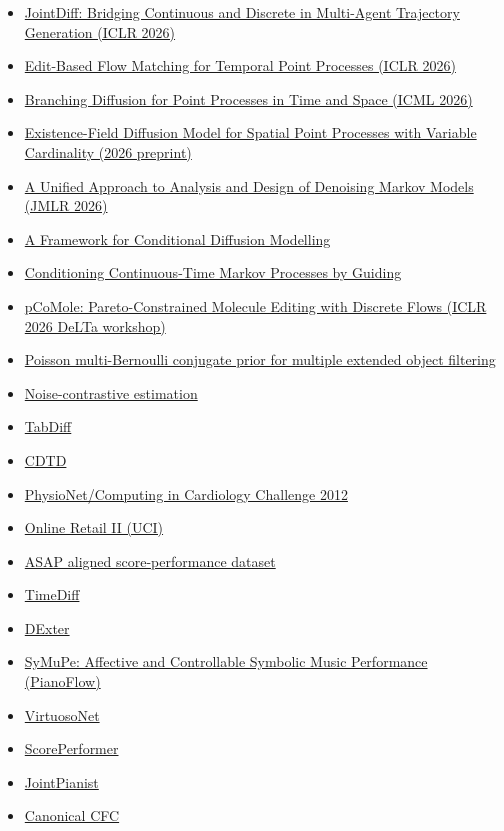 \documentclass[11pt]{article}
\begin{document}
\begin{itemize}
\item \href{https://openreview.net/forum?id=6jThckejtL}{JointDiff: Bridging Continuous and Discrete in Multi-Agent Trajectory Generation (ICLR 2026)}
\item \href{https://openreview.net/forum?id=FNf9IV1P2L}{Edit-Based Flow Matching for Temporal Point Processes (ICLR 2026)}
\item \href{https://openreview.net/pdf/574a07a3ab057971ab142c75a5fd8ad25a7c8312.pdf}{Branching Diffusion for Point Processes in Time and Space (ICML 2026)}
\item \href{https://arxiv.org/abs/2607.26428}{Existence-Field Diffusion Model for Spatial Point Processes with Variable Cardinality (2026 preprint)}
\item \href{https://www.jmlr.org/papers/v27/25-0693.html}{A Unified Approach to Analysis and Design of Denoising Markov Models (JMLR 2026)}
\item \href{https://openreview.net/forum?id=k2PA7CUUJH}{A Framework for Conditional Diffusion Modelling}
\item \href{https://doi.org/10.1080/17442508.2022.2150081}{Conditioning Continuous-Time Markov Processes by Guiding}
\item \href{https://openreview.net/forum?id=tTILzscPs4}{pCoMole: Pareto-Constrained Molecule Editing with Discrete Flows (ICLR 2026 DeLTa workshop)}
\item \href{https://doi.org/10.1109/TAES.2019.2920220}{Poisson multi-Bernoulli conjugate prior for multiple extended object filtering}
\item \href{https://proceedings.mlr.press/v9/gutmann10a.html}{Noise-contrastive estimation}
\item \href{https://openreview.net/forum?id=152c06fde5afb804fa5e2d50486a172bd56ec4e6}{TabDiff}
\item \href{https://openreview.net/forum?id=QPtoBPn4lZ}{CDTD}
\item \href{https://physionet.org/content/challenge-2012/1.0.0/}{PhysioNet/\allowbreak{}Computing in Cardiology Challenge 2012}
\item \href{https://archive.ics.uci.edu/dataset/502/online+retail+ii}{Online Retail II (UCI)}
\item \href{https://github.com/fosfrancesco/asap-dataset}{ASAP aligned score-performance dataset}
\item \href{https://academic.oup.com/jamia/article/31/11/2529/7747780}{TimeDiff}
\item \href{https://www.mdpi.com/2076-3417/14/15/6543}{DExter}
\item \href{https://arxiv.org/abs/2511.03425}{SyMuPe: Affective and Controllable Symbolic Music Performance (PianoFlow)}
\item \href{https://archives.ismir.net/ismir2019/paper/000112.pdf}{VirtuosoNet}
\item \href{https://archives.ismir.net/ismir2023/paper/000069.pdf}{ScorePerformer}
\item \href{https://iclr.cc/virtual/2026/poster/10011863}{JointPianist}
\item \href{https://www.nature.com/articles/s42256-022-00556-7}{Canonical CFC}
\end{itemize}
\end{document}
